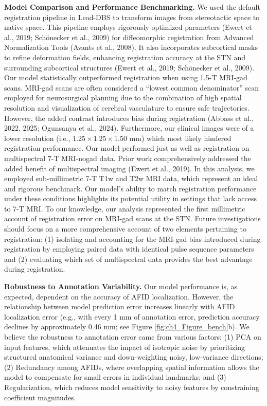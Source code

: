 \textbf{Model Comparison and Performance Benchmarking.} We used the default registration pipeline in Lead-DBS to transform images from stereotactic space to native space. This pipeline employs rigorously optimized parameters (Ewert et al., 2019; Schönecker et al., 2009) for diffeomorphic registration from Advanced Normalization Tools (Avants et al., 2008). It also incorporates subcortical masks to refine deformation fields, enhancing registration accuracy at the STN and surrounding subcortical structures (Ewert et al., 2019; Schönecker et al., 2009). Our model statistically outperformed registration when using 1.5-T MRI-gad scans. MRI-gad scans are often considered a “lowest common denominator” scan employed for neurosurgical planning due to the combination of high spatial resolution and visualization of cerebral vasculature to ensure safe trajectories. However, the added contrast introduces bias during registration (Abbass et al., 2022, 2025; Ogunsanya et al., 2024). Furthermore, our clinical images were of a lower resolution (i.e., \( 1.25 \times 1.25 \times 1.50 \) mm) which most likely hindered registration performance. Our model performed just as well as registration on multispectral 7-T MRI-nogad data. Prior work comprehensively addressed the added benefit of multispectral imaging (Ewert et al., 2019). In this analysis, we employed sub-millimetric 7-T T1w and T2w MRI data, which represent an ideal and rigorous benchmark. Our model’s ability to match registration performance under these conditions highlights its potential utility in settings that lack access to 7-T MRI. To our knowledge, our analysis represented the first millimetric account of registration error on MRI-gad scans at the STN. Future investigations should focus on a more comprehensive account of two elements pertaining to registration: (1) isolating and accounting for the MRI-gad bias introduced during registration by employing paired data with identical pulse sequence parameters and (2) evaluating which set of multispectral data provides the best advantage during registration.

\textbf{Robustness to Annotation Variability.} Our model performance is, as expected, dependent on the accuracy of AFID localization. However, the relationship between model prediction error increases linearly with AFID localization error (e.g., with every 1 mm of annotation error, prediction accuracy declines by approximately 0.46 mm; see Figure \ref{fig:ch4_Figure_bench}b). We believe the robustness to annotation error came from various factors: (1) PCA on input features, which attenuates the impact of isotropic noise by prioritizing structured anatomical variance and down-weighting noisy, low-variance directions; (2) Redundancy among AFIDs, where overlapping spatial information allows the model to compensate for small errors in individual landmarks; and (3) Regularization, which reduces model sensitivity to noisy features by constraining coefficient magnitudes.

